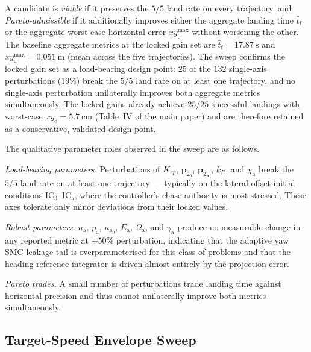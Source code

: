 \documentclass[10pt,journal]{IEEEtran}
\begin{document}
A candidate is \emph{viable} if it preserves the $5/5$ land rate on every trajectory, and \emph{Pareto-admissible} if it additionally improves either the aggregate landing time $\bar{t}_\text{f}$ or the aggregate worst-case horizontal error $xy_\text{e}^{\max}$ without worsening the other. The baseline aggregate metrics at the locked gain set are $\bar{t}_\text{f}=17.87~\text{s}$ and $xy_\text{e}^{\max}=0.051~\text{m}$ (mean across the five trajectories). The sweep confirms the locked gain set as a load-bearing design point: $25$ of the $132$ single-axis perturbations ($19\%$) break the $5/5$ land rate on at least one trajectory, and no single-axis perturbation unilaterally improves both aggregate metrics simultaneously. The locked gains already achieve $25/25$ successful landings with worst-case $xy_\text{e}=5.7~\text{cm}$ (Table~IV of the main paper) and are therefore retained as a conservative, validated design point.

The qualitative parameter roles observed in the sweep are as follows.

\emph{Load-bearing parameters.} Perturbations of $K_{rp}$, $\boldsymbol{p}_{2_0}$, $\boldsymbol{p}_{2_\infty}$, $k_R$, and $\chi_\text{a}$ break the $5/5$ land rate on at least one trajectory --- typically on the lateral-offset initial conditions IC$_3$--IC$_5$, where the controller's chase authority is most stressed. These axes tolerate only minor deviations from their locked values.

\emph{Robust parameters.} $n_\text{a}$, $p_\text{a}$, $\kappa_{\text{a}_0}$, $E_\text{a}$, $\Omega_\text{a}$, and $\gamma_\text{a}$ produce no measurable change in any reported metric at $\pm 50\%$ perturbation, indicating that the adaptive yaw SMC leakage tail is overparameterised for this class of problems and that the heading-reference integrator is driven almost entirely by the projection error.

\emph{Pareto trades.} A small number of perturbations trade landing time against horizontal precision and thus cannot unilaterally improve both metrics simultaneously.

\clearpage
\subsection{Target-Speed Envelope Sweep}
\label{sec:sup-speed}
\end{document}

